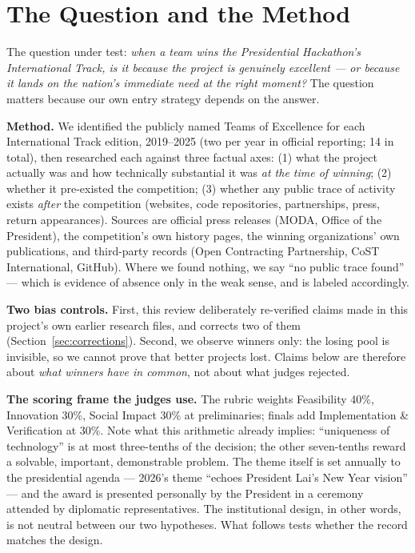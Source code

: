 \section{The Question and the Method}\label{sec:q}

The question under test: \emph{when a team wins the Presidential Hackathon's
International Track, is it because the project is genuinely excellent --- or
because it lands on the nation's immediate need at the right moment?} The
question matters because our own entry strategy depends on the answer.

\textbf{Method.} We identified the publicly named Teams of Excellence for each
International Track edition, 2019--2025 (two per year in official reporting;
14 in total), then researched each against three factual axes: (1) what the
project actually was and how technically substantial it was \emph{at the time
of winning}; (2) whether it pre-existed the competition; (3) whether any
public trace of activity exists \emph{after} the competition (websites, code
repositories, partnerships, press, return appearances). Sources are official
press releases (MODA, Office of the President), the competition's own history
pages, the winning organizations' own publications, and third-party records
(Open Contracting Partnership, CoST International, GitHub). Where we found
nothing, we say ``no public trace found'' --- which is evidence of absence
only in the weak sense, and is labeled accordingly.

\textbf{Two bias controls.} First, this review deliberately re-verified claims
made in this project's own earlier research files, and corrects two of them
(Section~\ref{sec:corrections}). Second, we observe winners only: the losing
pool is invisible, so we cannot prove that better projects lost. Claims below
are therefore about \emph{what winners have in common}, not about what judges
rejected.

\textbf{The scoring frame the judges use.} The rubric weights Feasibility 40\%,
Innovation 30\%, Social Impact 30\% at preliminaries; finals add
Implementation \& Verification at 30\%\cite{handbook}. Note what this
arithmetic already implies: ``uniqueness of technology'' is at most
three-tenths of the decision; the other seven-tenths reward a solvable,
important, demonstrable problem. The theme itself is set annually to the
presidential agenda --- 2026's theme ``echoes President Lai's New Year
vision''\cite{handbook} --- and the award is presented personally by the
President in a ceremony attended by diplomatic representatives\cite{focuscrop}.
The institutional design, in other words, is not neutral between our two
hypotheses. What follows tests whether the record matches the design.

